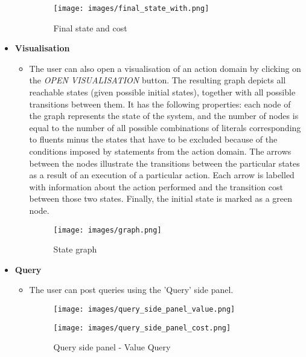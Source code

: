 \documentclass[a4paper]{article}
\begin{document}
\begin{itemize}
\begin{itemize}
\begin{figure}[H]
                    \texttt{[image: images/final\_state\_with.png]}
                    \caption{Final state and cost}
                    \label{fig:cm-rho-001}
                \end{figure}
        \end{itemize}
    \item \textbf{Visualisation}
        \begin{itemize}
            \item[] The user can also open a visualisation of an action domain by clicking on the \textit{OPEN VISUALISATION} button. The resulting graph depicts all reachable states (given possible initial states), together with all possible transitions between them. It has the following properties: each node of the graph represents the state of the system, and the number of nodes is equal to the number of all possible combinations of literals corresponding to fluents minus the states that have to be excluded because of the conditions imposed by statements from the action domain. The arrows between the nodes illustrate the transitions between the particular states as a result of an execution of a particular action. Each arrow is labelled with information about the action performed and the transition cost between those two states. Finally, the initial state is marked as a green node.
                \begin{figure}[H]
                    \centering
                    \texttt{[image: images/graph.png]}
                    \caption{State graph}
                    \label{fig:cm-rho-001}
                \end{figure}
        \end{itemize}
    \item \textbf{Query}
        \begin{itemize}
            \item[] The user can post queries using the 'Query' side panel.
            \begin{figure}[H]
                \centering
                \begin{minipage}[b]{0.4\textwidth}
                    \texttt{[image: images/query\_side\_panel\_value.png]}
                    \caption{Query side panel - Value Query}
                    \label{fig:cm-rho-001}
                \end{minipage}
                \begin{minipage}[b]{0.4\textwidth}
                    \texttt{[image: images/query\_side\_panel\_cost.png]}

\end{minipage}
\end{figure}
\end{itemize}
\end{itemize}
\end{document}
